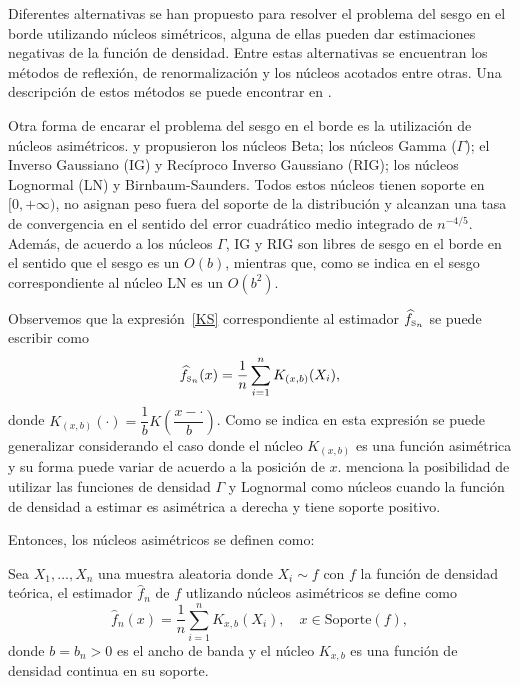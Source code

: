 Diferentes alternativas se han propuesto para resolver el problema del sesgo en el borde utilizando núcleos simétricos, alguna de ellas pueden dar estimaciones negativas de la función de densidad. Entre estas alternativas se encuentran los métodos de reflexión, de renormalización y los núcleos acotados entre otras. Una descripción de estos métodos se puede encontrar en \citet{Jones1993}.


Otra forma de encarar el problema del sesgo en el borde es la utilización de núcleos asimétricos. 
\citet{Brown1999} y \citet{chen1999} propusieron los núcleos Beta; 
\citet{chensx2000} los núcleos Gamma ($\Gamma$);  
\citet{Scaillet2004} el Inverso Gaussiano (IG) y Recíproco Inverso Gaussiano (RIG); 
\citet{Jin2003} los núcleos Lognormal (LN) y Birnbaum-Saunders. 
Todos estos núcleos tienen soporte en $[0,+\infty)$, no asignan peso fuera del soporte de la distribución y alcanzan una tasa de convergencia en el sentido del error cuadrático medio integrado de $n^{-4/5}$. 
Además, de acuerdo a \citet{Scaillet2004}  los núcleos $\Gamma$, IG y RIG son libres de sesgo en el borde en el sentido que el sesgo es un $O(b)$, mientras que, como se indica en \citet{Libnegue2013} el sesgo correspondiente al núcleo LN es un $O(b^2)$.

Observemos que la expresión~\ref{KS} correspondiente al estimador $\widehat{f}_{\text{\tiny S}_n}$ se puede escribir como
\begin{align}
\label{DefNucleosSim}
\widehat{f}_{\text{\tiny S}_n}(x)=\dfrac{1}{n} \sum_{i=1}^n K_{(x,b)} (X_i),
\end{align}
donde $K_{(x,b)}(\cdot) =\dfrac{1}{b} K\left(\dfrac{x-\cdot}{b}\right)$. Como se indica en \citet{Hirukawa2018} esta expresión se puede generalizar considerando el caso donde el núcleo $K_{(x,b)}$ es una función asimétrica y su forma puede variar de acuerdo a la posición de $x$. \citet{Silverman1986} menciona la posibilidad de utilizar las funciones de densidad $\Gamma$ y Lognormal como núcleos cuando la función de densidad a estimar es asimétrica a derecha y tiene soporte positivo. 

Entonces, los núcleos asimétricos se definen como:


\begin{definition}
\label{DefNucleo}
Sea $X_1, \ldots, X_n$ una muestra aleatoria donde $X_i \sim f$ con $f$ la función de densidad teórica, el estimador $\widehat{f}_n$ de $f$ utlizando núcleos asimétricos se define como 
\begin{equation}
\widehat{f}_n(x)=\frac{1}{n}\sum_{i=1}^n K_{x,b}(X_i), \quad x \in \text{Soporte}(f),
\label{fn}
\end{equation}
donde  $b=b_n>0$ es el ancho de banda  y el núcleo $K_{x,b}$ es una función de densidad continua en su soporte.
\end{definition}

